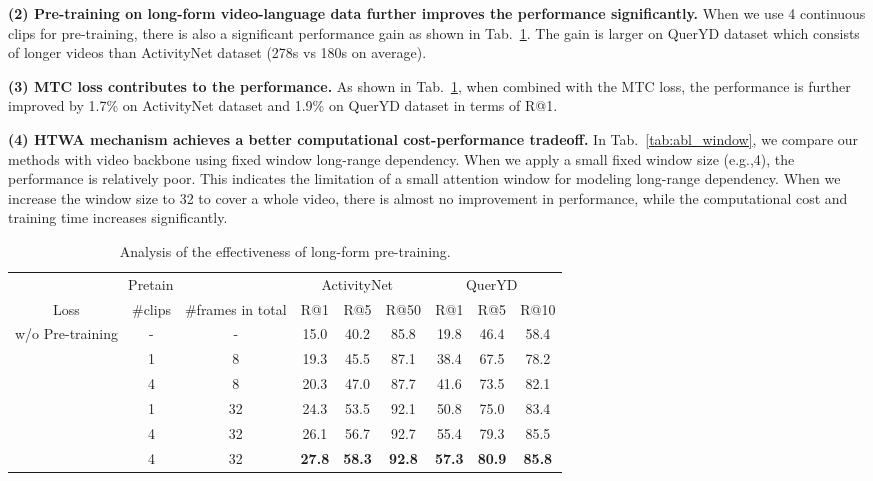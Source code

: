 \documentclass{article}
\begin{document}
\textbf{(2) Pre-training on long-form video-language data further improves the performance significantly.}
When we use 4 continuous clips for pre-training, there is also a significant performance gain as shown in Tab.~\ref{tab:abl_longform}. The gain is larger on QuerYD dataset which consists of longer videos than ActivityNet dataset (278s vs 180s on average).

\textbf{(3) MTC loss contributes to the performance.}
As shown in Tab.~\ref{tab:abl_longform}, when combined with the MTC loss, the performance is further improved by 1.7\% on ActivityNet dataset and 1.9\% on QuerYD dataset in terms of R@1. 

\textbf{(4) HTWA mechanism achieves a better computational cost-performance tradeoff.}
In Tab.~\ref{tab:abl_window}, we compare our methods with video backbone using fixed window long-range dependency. When we apply a small fixed window size (e.g.,4), the performance is relatively poor. This indicates the limitation of a small attention window for modeling long-range dependency. When we increase the window size to 32 to cover a whole video, there is almost no improvement in performance, while the computational cost and training time increases significantly. 

\begin{table}[t]
    \small
    \centering
    \caption{Analysis of the effectiveness of long-form pre-training.}
    \begin{tabular}{c c c c c c c c c} 
    \toprule
    \multicolumn{3}{c}{Pretain}&\multicolumn{3}{c}{ActivityNet~\cite{krishna2017actnetcaption}}&\multicolumn{3}{c}{QuerYD~\cite{oncescu2021queryd}} \\ 
    \cmidrule{1-9}
    Loss & \#clips & \#frames in total & R@1 & R@5 & R@50 &  R@1 & R@5 & R@10 \\
    \cmidrule{1-9}
    w/o Pre-training &- &- &15.0 &40.2 & 85.8 &19.8 &46.4 &58.4\\
    \cmidrule{1-9}
    \multirow{4}{*}{} 
    & 1 &8 &19.3 &45.5 &87.1 &38.4 &67.5 &78.2 \\ 
    & 4 &8 &20.3 &47.0 &87.7 &41.6 &73.5 &82.1 \\
    & 1 &32 &24.3 &53.5 &92.1 &50.8 &75.0 &83.4\\
    & 4 &32 & 26.1 & 56.7 & 92.7 &55.4 &79.3 &85.5\\
    \cmidrule{1-9}
     & 4 &32 & \bf 27.8 & \bf 58.3 & \bf 92.8 &\bf57.3 &\bf80.9 &\bf85.8 \\
    \cmidrule{1-9}
    \end{tabular}
    \label{tab:abl_longform}
\end{table}
\end{document}
